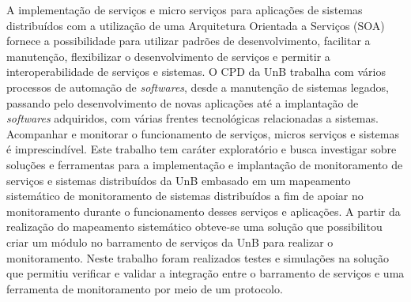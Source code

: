 A implementação de serviços e micro serviços para aplicações de sistemas distribuídos com a utilização de uma Arquitetura Orientada a Serviços (\acrshort{SOA}) fornece a possibilidade para utilizar padrões de desenvolvimento, facilitar a manutenção, flexibilizar o desenvolvimento de serviços e permitir a interoperabilidade de serviços e sistemas. O \acrfull{CPD} da \acrfull{UnB} trabalha com vários processos de automação de \textit{softwares}, desde a manutenção de sistemas legados, passando pelo desenvolvimento de novas aplicações até a implantação de \textit{softwares} adquiridos, com várias frentes tecnológicas relacionadas a sistemas. Acompanhar e monitorar o funcionamento de serviços, micros serviços e sistemas é imprescindível. Este trabalho tem caráter exploratório e busca investigar sobre soluções e ferramentas para a implementação e implantação de monitoramento de serviços e sistemas distribuídos da \acrfull{UnB} embasado em um mapeamento sistemático de monitoramento de sistemas distribuídos a fim de apoiar no monitoramento durante o funcionamento desses serviços e aplicações. A partir da realização do mapeamento sistemático obteve-se uma solução que possibilitou criar um módulo no barramento de serviços da \acrfull{UnB} para realizar o monitoramento. Neste trabalho foram realizados testes e simulações na solução que permitiu verificar e validar a integração entre o barramento de serviços e uma ferramenta de monitoramento por meio de um protocolo.